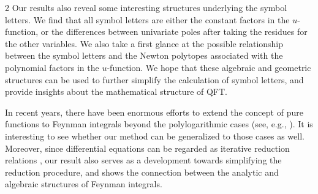 \documentclass[fleqn]{2023SCGE}
\begin{document}
\begin{multicols}{2}
Our results also reveal some interesting structures underlying the symbol letters. We find that all symbol letters are either the constant factors in the $u$-function, or the differences between univariate poles after taking the residues for the other variables.  We also take a first glance at the possible relationship between the symbol letters and the Newton polytopes
associated with the polynomial factors in the $u$-function. We hope that these algebraic and geometric structures can be used to further simplify the calculation of symbol letters, and provide insights about the mathematical structure of QFT.

In recent years, there have been enormous efforts to extend the concept of pure functions to Feynman integrals beyond the polylogarithmic cases (see, e.g., \cite{Broedel:2018qkq, Frellesvig:2023iwr}). It is interesting to see whether our method can be generalized to those cases as well. Moreover, since differential equations can be regarded as iterative reduction relations \cite{Chen:2022jux}, our result also serves as a development towards simplifying the reduction procedure, and shows the connection between the analytic and algebraic structures of Feynman integrals.
















\end{multicols}
\end{document}

